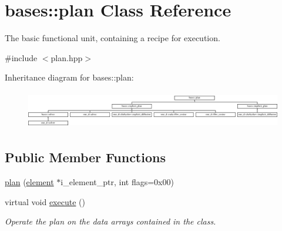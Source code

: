 \hypertarget{classbases_1_1plan}{\section{bases\-:\-:plan Class Reference}
\label{classbases_1_1plan}
}


The basic functional unit, containing a recipe for execution.  




{\ttfamily \#include $<$plan.\-hpp$>$}

Inheritance diagram for bases\-:\-:plan\-:\begin{figure}[H]
\begin{center}
\leavevmode
\includegraphics[height=1.674140cm]{classbases_1_1plan}
\end{center}
\end{figure}
\subsection*{Public Member Functions}
\begin{DoxyCompactItemize}
\item 
\hyperlink{classbases_1_1plan_ad0516a1b2b7d3262ea3abab8e8d5edf2}{plan} (\hyperlink{classbases_1_1element}{element} $\ast$i\-\_\-element\-\_\-ptr, int flags=0x00)
\item 
virtual void \hyperlink{classbases_1_1plan_a85d7e7f7a04ac8213ea57bde32db34c2}{execute} ()
\begin{DoxyCompactList}\small\item\em Operate the plan on the data arrays contained in the class. \end{DoxyCompactList}\end{DoxyCompactItemize}
